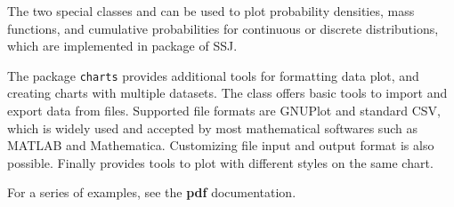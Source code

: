 The two special classes
 and
can be used to plot probability densities, mass functions,
and cumulative probabilities for continuous or discrete distributions,
which are implemented in package
 of SSJ.


The package \texttt{charts} provides additional tools for formatting
 data plot, and creating charts with multiple datasets. The
 class
offers basic tools to import and export data from files.
Supported file formats are GNUPlot and standard CSV, which is widely
used and accepted by most mathematical softwares such as
MATLAB and Mathematica. Customizing file input and output format is also possible.
Finally 
 provides tools to plot with different styles on the same chart.

\latex{\label {sec:examples}}

\begin{htmlonly}
For a series of examples, see the \textbf{pdf} documentation.
\end{htmlonly}

